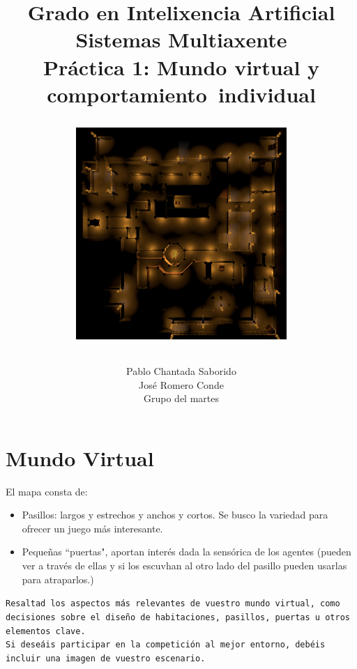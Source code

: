 \documentclass[a4paper,12.5pt]{article}
\begin{document}
\title{\vspace{-70pt}\begingroup  
    \centering
    \large Grado en Intelixencia Artificial\\
    \large Sistemas Multiaxente\\[0.5em]
    \large \textbf{Práctica 1: Mundo virtual y comportamiento~individual}\par 
    \vspace{20}
    \includegraphics[width=0.6\textwidth]{mapa.png}\\
\endgroup}
\author{Pablo Chantada Saborido \\ José Romero Conde \\ Grupo del martes}

\date{}
\maketitle
\vspace{-30pt}


\section*{\large Mundo Virtual}

El mapa consta de:
\begin{itemize}
\item  Pasillos: largos y estrechos y anchos y cortos. Se busco la variedad para ofrecer un juego más interesante.
\item  Pequeñas ``puertas", aportan interés dada la sensórica de los agentes (pueden ver a través de ellas y si los escuvhan al otro lado del pasillo pueden usarlas para atraparlos.) 
\end{itemize}
\texttt{Resaltad los aspectos más relevantes de vuestro mundo virtual, como decisiones sobre el diseño de habitaciones, pasillos, puertas u otros elementos clave. \\ Si deseáis participar en la competición al mejor entorno, debéis incluir una imagen de vuestro escenario.}
\end{document}
